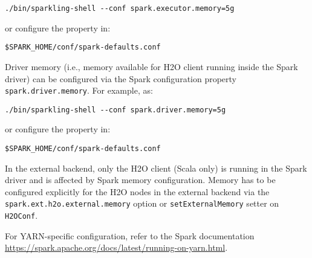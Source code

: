 \begin{lstlisting}[style=bash]
./bin/sparkling-shell --conf spark.executor.memory=5g
\end{lstlisting}

or configure the property in:

\begin{lstlisting}[style=bash]
$SPARK_HOME/conf/spark-defaults.conf
\end{lstlisting}

Driver memory (i.e., memory available for H2O client running inside the Spark driver) can be configured via the Spark
configuration property \texttt{spark.driver.memory}. For example, as:

\begin{lstlisting}[style=bash]
./bin/sparkling-shell --conf spark.driver.memory=5g
\end{lstlisting}

or configure the property in:

\begin{lstlisting}[style=bash]
$SPARK_HOME/conf/spark-defaults.conf
\end{lstlisting}

In the external backend, only the H2O client (Scala only) is running in the Spark driver and is affected by Spark
memory configuration. Memory has to be configured explicitly for the H2O nodes in the external backend via the
\texttt{spark.ext.h2o.external.memory} option or \texttt{setExternalMemory} setter on \texttt{H2OConf}.

For YARN-specific configuration, refer to the Spark documentation \url{https://spark.apache.org/docs/latest/running-on-yarn.html}.
